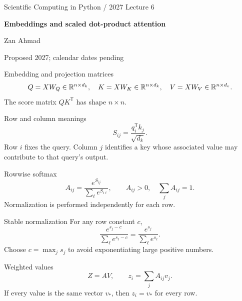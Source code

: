 \documentclass[aspectratio=169,11pt]{beamer}
\newcommand{\notestarget}{notes.pdf}\newcommand{\noteslabel}{Notes}
\begin{document}
\begin{frame}[plain]\vfill
{\small\color{accent} Scientific Computing in Python / 2027 \quad Lecture 6}\par\medskip
{\raggedright{}\LARGE\bfseries\color{ink} Embeddings and scaled dot-product attention}\par\bigskip
Zan Ahmad\par\smallskip
{\small Proposed 2027; calendar dates pending}\par\vfill\end{frame}
\renewcommand{\notestarget}{notes.pdf\#note-embedding-and-projection-matrices}
\begin{frame}[t,fragile,label=slide-embedding-and-projection-matrices]{Embedding and projection matrices}
\[
Q=XW_Q\in\mathbb{R}^{n\times d_k},\quad
K=XW_K\in\mathbb{R}^{n\times d_k},\quad
V=XW_V\in\mathbb{R}^{n\times d_v}.
\]
\pause{}
The score matrix $QK^{\mathsf T}$ has shape $n\times n$.
\end{frame}
\renewcommand{\notestarget}{notes.pdf\#note-embedding-and-projection-matrices}
\begin{frame}[t,fragile,label=slide-row-and-column-meanings]{Row and column meanings}
\[
S_{ij}=\frac{q_i^{\mathsf T}k_j}{\sqrt{d_k}}.
\]
\pause{}
Row $i$ fixes the query. Column $j$ identifies a key whose associated value may contribute to that query's output.
\end{frame}
\renewcommand{\notestarget}{notes.pdf\#note-rowwise-softmax}
\begin{frame}[t,fragile,label=slide-rowwise-softmax]{Rowwise softmax}
\[
A_{ij}=\frac{e^{S_{ij}}}{\sum_{\ell}e^{S_{i\ell}}},\qquad
A_{ij}>0,\quad\sum_jA_{ij}=1.
\]
\pause{}
Normalization is performed independently for each row.
\end{frame}
\renewcommand{\notestarget}{notes.pdf\#note-rowwise-softmax}
\begin{frame}[t,fragile,label=slide-stable-normalization]{Stable normalization}
For any row constant $c$,
\[
\frac{e^{s_j-c}}{\sum_\ell e^{s_\ell-c}}
=\frac{e^{s_j}}{\sum_\ell e^{s_\ell}}.
\]
\pause{}
Choose $c=\max_j s_j$ to avoid exponentiating large positive numbers.
\end{frame}
\renewcommand{\notestarget}{notes.pdf\#note-weighted-values}
\begin{frame}[t,fragile,label=slide-weighted-values]{Weighted values}
\[
Z=AV,\qquad z_i=\sum_j A_{ij}v_j.
\]
\pause{}
If every value is the same vector $v_*$, then $z_i=v_*$ for every row.
\end{frame}
\end{document}
